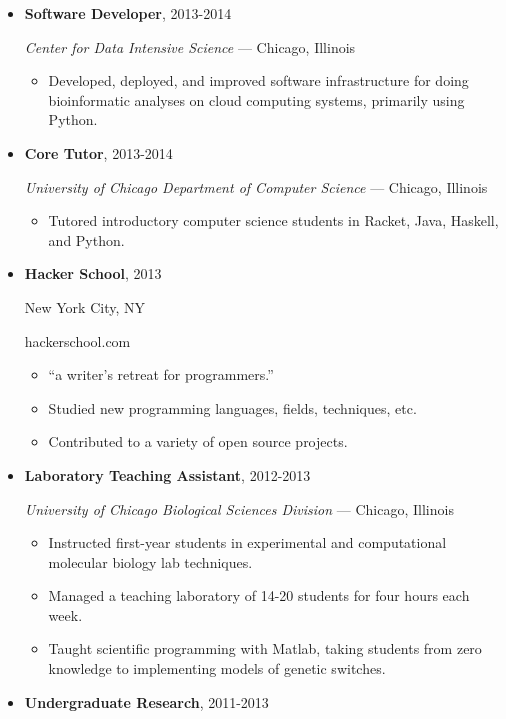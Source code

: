 \documentclass[]{article}
\begin{document}
\begin{itemize}
\item
  \textbf{Software Developer}, 2013-2014

  \emph{Center for Data Intensive Science} --- Chicago, Illinois

  \begin{itemize}
  \itemsep1pt\parskip0pt
  \item
    Developed, deployed, and improved software infrastructure for doing
    bioinformatic analyses on cloud computing systems, primarily using
    Python.
  \end{itemize}
\item
  \textbf{Core Tutor}, 2013-2014

  \emph{University of Chicago Department of Computer Science} ---
  Chicago, Illinois

  \begin{itemize}
  \itemsep1pt\parskip0pt
  \item
    Tutored introductory computer science students in Racket, Java,
    Haskell, and Python.
  \end{itemize}
\item
  \textbf{Hacker School}, 2013

  New York City, NY

  hackerschool.com

  \begin{itemize}
  \itemsep1pt\parskip0pt
  \item
    ``a writer's retreat for programmers.''
  \item
    Studied new programming languages, fields, techniques, etc.
  \item
    Contributed to a variety of open source projects.
  \end{itemize}
\item
  \textbf{Laboratory Teaching Assistant}, 2012-2013

  \emph{University of Chicago Biological Sciences Division} --- Chicago,
  Illinois

  \begin{itemize}
  \itemsep1pt\parskip0pt
  \item
    Instructed first-year students in experimental and computational
    molecular biology lab techniques.
  \item
    Managed a teaching laboratory of 14-20 students for four hours each
    week.
  \item
    Taught scientific programming with Matlab, taking students from zero
    knowledge to implementing models of genetic switches.
  \end{itemize}
\item
  \textbf{Undergraduate Research}, 2011-2013


\end{itemize}
\end{document}
